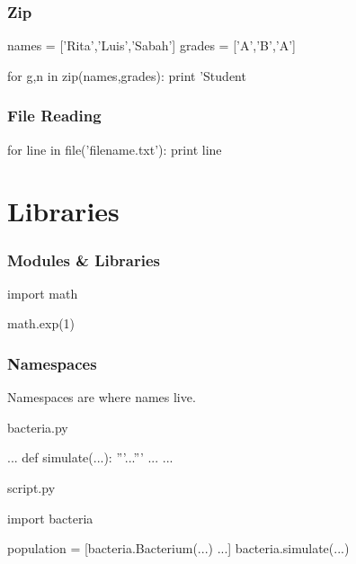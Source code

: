 \begin{frame}[fragile]
\frametitle{Zip}

\begin{python}
names = ['Rita','Luis','Sabah']
grades = ['A','B','A']

for g,n in zip(names,grades):
    print 'Student %
\end{python}

\end{frame}

\begin{frame}[fragile]
\frametitle{File Reading}

\begin{python}
for line in file('filename.txt'):
    print line
\end{python}

\end{frame}

\section{Libraries}

\begin{frame}[fragile]
\frametitle{Modules \& Libraries}
\begin{python}
import math

math.exp(1)
\end{python}
\end{frame}

\begin{frame}[fragile]
\frametitle{Namespaces}
Namespaces are where names live.
\end{frame}

\begin{frame}[fragile]

\begin{block}{bacteria.py}
\begin{python}
...
def simulate(...):
    '''...'''
    ...
...
\end{python}
\end{block}

\begin{block}{script.py}
\begin{python}
import bacteria

population = [bacteria.Bacterium(...) ...]
bacteria.simulate(...)
\end{python}
\end{block}

\end{frame}

